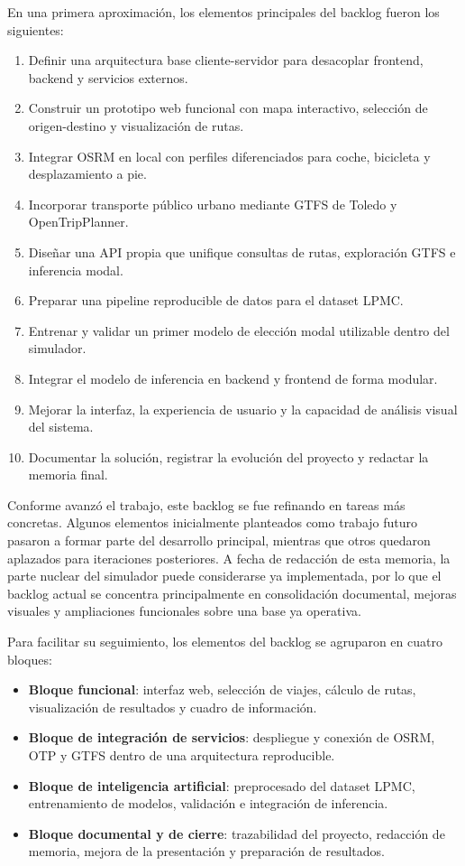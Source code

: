 En una primera aproximación, los elementos principales del backlog fueron los siguientes:

\begin{enumerate}
  \item Definir una arquitectura base cliente-servidor para desacoplar frontend, backend y servicios externos.
  \item Construir un prototipo web funcional con mapa interactivo, selección de origen-destino y visualización de rutas.
  \item Integrar OSRM en local con perfiles diferenciados para coche, bicicleta y desplazamiento a pie.
  \item Incorporar transporte público urbano mediante GTFS de Toledo y OpenTripPlanner.
  \item Diseñar una API propia que unifique consultas de rutas, exploración GTFS e inferencia modal.
  \item Preparar una pipeline reproducible de datos para el dataset LPMC.
  \item Entrenar y validar un primer modelo de elección modal utilizable dentro del simulador.
  \item Integrar el modelo de inferencia en backend y frontend de forma modular.
  \item Mejorar la interfaz, la experiencia de usuario y la capacidad de análisis visual del sistema.
  \item Documentar la solución, registrar la evolución del proyecto y redactar la memoria final.
\end{enumerate}

Conforme avanzó el trabajo, este backlog se fue refinando en tareas más concretas. Algunos elementos inicialmente planteados como trabajo futuro pasaron a formar parte del desarrollo principal, mientras que otros quedaron aplazados para iteraciones posteriores. A fecha de redacción de esta memoria, la parte nuclear del simulador puede considerarse ya implementada, por lo que el backlog actual se concentra principalmente en consolidación documental, mejoras visuales y ampliaciones funcionales sobre una base ya operativa.

Para facilitar su seguimiento, los elementos del backlog se agruparon en cuatro bloques:
\begin{itemize}
  \item \textbf{Bloque funcional}: interfaz web, selección de viajes, cálculo de rutas, visualización de resultados y cuadro de información.
  \item \textbf{Bloque de integración de servicios}: despliegue y conexión de OSRM, OTP y GTFS dentro de una arquitectura reproducible.
  \item \textbf{Bloque de inteligencia artificial}: preprocesado del dataset LPMC, entrenamiento de modelos, validación e integración de inferencia.
  \item \textbf{Bloque documental y de cierre}: trazabilidad del proyecto, redacción de memoria, mejora de la presentación y preparación de resultados.
\end{itemize}


